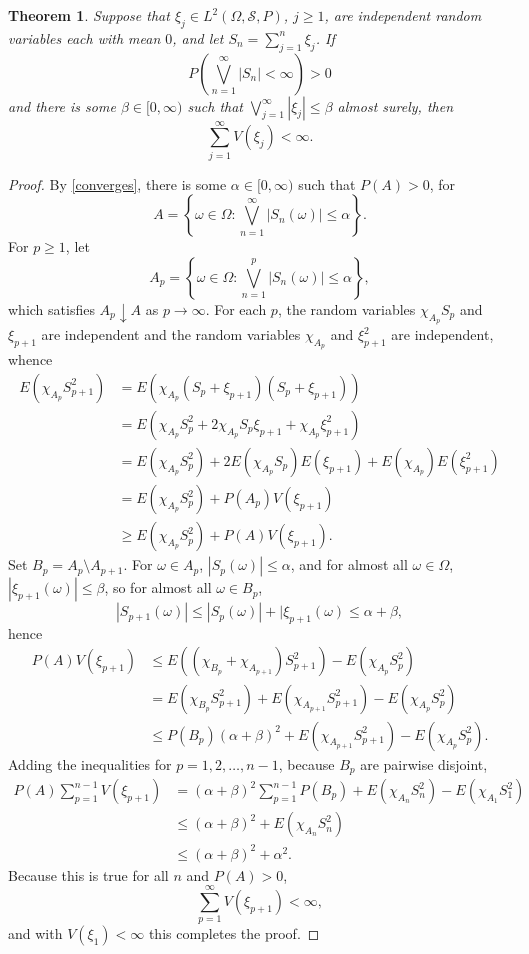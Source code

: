 \documentclass{article}
\newtheorem{theorem}{Theorem}
\theoremstyle{definition}
\begin{document}
\begin{theorem}
Suppose that $\xi_j \in L^2(\Omega,\mathscr{S},P)$, $j \geq 1$, are independent  random variables
each with mean $0$, and let
$S_n=\sum_{j=1}^n \xi_j$.
 If 
 \begin{equation}
P\left( \bigvee_{n=1}^\infty |S_n|<\infty \right)>0
\label{converges}
\end{equation}
and
 there is some $\beta \in [0,\infty)$ such that
$\bigvee_{j=1}^\infty |\xi_j| \leq \beta$ almost surely, then 
\[
\sum_{j=1}^\infty V(\xi_j)<\infty.
\]
\end{theorem}
\begin{proof}
By \eqref{converges}, there is some $\alpha \in [0,\infty)$ such that $P(A)>0$, for
\[
A = \left\{ \omega \in \Omega: \bigvee_{n=1}^\infty |S_n(\omega)| \leq \alpha \right\}.
\]
For $p \geq 1$, let
\[
A_p = \left\{ \omega \in \Omega: \bigvee_{n=1}^p |S_n(\omega)| \leq \alpha \right\},
\]
which satisfies $A_p \downarrow A$ as $p \to \infty$. For each $p$, the random variables
$\chi_{A_p} S_p$ and $\xi_{p+1}$ are independent and the random variables
$\chi_{A_p}$ and $\xi_{p+1}^2$ are independent,
whence
\begin{align*}
E(\chi_{A_p} S_{p+1}^2)&=E(\chi_{A_p} (S_p+\xi_{p+1})(S_p+\xi_{p+1}))\\
&=E(\chi_{A_p} S_p^2+2\chi_{A_p} S_p \xi_{p+1} + \chi_{A_p} \xi_{p+1}^2)\\
&=E(\chi_{A_p} S_p^2) + 2 E(\chi_{A_p} S_p) E(\xi_{p+1})+E(\chi_{A_p}) E(\xi_{p+1}^2)\\
&=E(\chi_{A_p} S_p^2) + P(A_p) V(\xi_{p+1})\\
&\geq E(\chi_{A_p} S_p^2) + P(A) V(\xi_{p+1}).
\end{align*}
Set $B_p = A_p \setminus A_{p+1}$. For $\omega \in A_p$, $|S_p(\omega)| \leq \alpha$, and for almost
all $\omega \in \Omega$, $|\xi_{p+1}(\omega)| \leq \beta$, so for almost all $\omega 
\in B_p$,
\[
|S_{p+1}(\omega)| \leq |S_p(\omega)| + |\xi_{p+1}(\omega) \leq \alpha+\beta,
\]
hence
\begin{align*}
P(A)V(\xi_{p+1})&\leq E((\chi_{B_p}+\chi_{A_{p+1}}) S_{p+1}^2) - E(\chi_{A_p} S_p^2)\\
&=E(\chi_{B_p} S_{p+1}^2)+E(\chi_{A_{p+1}}S_{p+1}^2)- E(\chi_{A_p} S_p^2)\\
&\leq P(B_p) (\alpha+\beta)^2 + E(\chi_{A_{p+1}}S_{p+1}^2)- E(\chi_{A_p} S_p^2).
\end{align*}
Adding the inequalities for $p=1,2,\ldots,n-1$, because $B_p$ are pairwise disjoint,
\begin{align*}
P(A) \sum_{p=1}^{n-1} V(\xi_{p+1})&= (\alpha+\beta)^2 \sum_{p=1}^{n-1} P(B_p) + E(\chi_{A_n} S_n^2) - 
E(\chi_{A_1} S_1^2)\\
&\leq (\alpha+\beta)^2 + E(\chi_{A_n} S_n^2)\\
&\leq (\alpha+\beta)^2 + \alpha^2.
\end{align*}
Because this is true for all $n$ and $P(A)>0$,
\[
\sum_{p=1}^\infty V(\xi_{p+1}) < \infty,
\]
and with $V(\xi_1)<\infty$ this completes the proof.
\end{proof}
\end{document}

